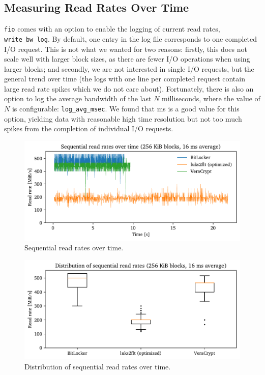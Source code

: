 \subsection{Measuring Read Rates Over Time}
\label{chap:performance.hwexperiments.readrateovertime}
\texttt{fio} comes with an option to enable the logging of current read rates, \texttt{write\_bw\_log}. By default, one entry in the log file corresponds to one completed I/O request. This is not what we wanted for two reasons: firstly, this does not scale well with larger block sizes, as there are fewer I/O operations when using larger blocks; and secondly, we are not interested in single I/O requests, but the general trend over time (the logs with one line per completed request contain large read rate spikes which we do not care about). Fortunately, there is also an option to log the average bandwidth of the last $N$ milliseconds, where the value of $N$ is configurable: \texttt{log\_avg\_msec}. We found that  ms is a good value for this option, yielding data with reasonable high time resolution but not too much spikes from the completion of individual I/O requests.

\begin{figure}[htb!]
	\center
	\includegraphics[scale=1]{../fig/performance.hwexperiments.seqovertime.pdf}
	\caption[
		Sequential read rates over time
	]{
		Sequential read rates over time.  
	}
	\label{fig:performance.hwexperiments.seqovertime}
\end{figure}

\begin{figure}[htb!]
	\center
	\includegraphics[scale=1]{../fig/performance.hwexperiments.seqovertimebox.pdf}
	\caption[
		Distribution of sequential read rates over time
	]{
		Distribution of sequential read rates over time.  
	}
	\label{fig:performance.hwexperiments.seqovertimebox}
\end{figure}

